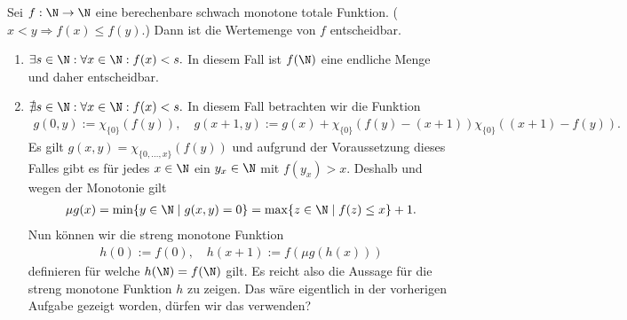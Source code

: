 
\begin{exercise}[215]

\phantom{}

	Sei $f:\N \to \N$ eine berechenbare schwach monotone totale Funktion. ($x < y \Rightarrow f(x) \leq f(y)$.) Dann ist die Wertemenge von $f$ entscheidbar.

\end{exercise}


\begin{solution}

\phantom{}

	\begin{enumerate}[label = Fall \arabic*:]
		\item $\exists s \in \N: \forall x \in \N: f(x) < s.$ In diesem Fall ist $f(\N)$ eine endliche Menge und daher entscheidbar.
		\item $\nexists s \in \N: \forall x \in \N: f(x) < s.$ In diesem Fall betrachten wir die Funktion
			\begin{align*}
			g(0,y) := \chi_{\{0\}}(f(y)), \quad g(x + 1, y) := g(x) + \chi_{\{0\}}(f(y) - (x + 1)) \chi_{\{0\}}((x + 1) - f(y)).
			\end{align*}
			Es gilt $g(x,y) = \chi_{\{0, \dots, x\}}(f(y))$ und aufgrund der Voraussetzung dieses Falles gibt es für jedes $x \in \N$ ein $y_x \in \N$ mit $f(y_x) > x$. Deshalb und wegen der Monotonie gilt
			\begin{align*}
			\mu g(x) = \min\{y \in \N \mid g(x,y) = 0\} = \max\{z \in \N \mid f(z) \leq x\} + 1.
			\end{align*}
			Nun können wir die streng monotone Funktion
			\begin{align*}
			h(0) := f(0), \quad h(x + 1) := f(\mu g(h(x)))
			\end{align*}
			definieren für welche $h(\N) = f(\N)$ gilt. Es reicht also die Aussage für die streng monotone Funktion $h$ zu zeigen. Das wäre eigentlich in der vorherigen Aufgabe gezeigt worden, dürfen wir das verwenden?
	\end{enumerate}

\end{solution}
